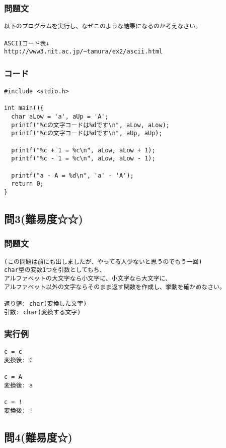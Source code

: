 \subsubsection{問題文}
\begin{verbatim}
以下のプログラムを実行し、なぜこのような結果になるのか考えなさい。

ASCIIコード表↓
http://www3.nit.ac.jp/~tamura/ex2/ascii.html
\end{verbatim}

\subsubsection{コード}
\begin{verbatim}
#include <stdio.h>

int main(){
  char aLow = 'a', aUp = 'A';
  printf("%cの文字コードは%dです\n", aLow, aLow);
  printf("%cの文字コードは%dです\n", aUp, aUp);

  printf("%c + 1 = %c\n", aLow, aLow + 1);
  printf("%c - 1 = %c\n", aLow, aLow - 1);

  printf("a - A = %d\n", 'a' - 'A');
  return 0;
}
\end{verbatim}

\subsection{問3(難易度☆☆)}
\subsubsection{問題文}
\begin{verbatim}
(この問題は前にも出しましたが、やってる人少ないと思うのでもう一回)
char型の変数1つを引数としてもち、
アルファベットの大文字なら小文字に、小文字なら大文字に、
アルファベット以外の文字ならそのまま返す関数を作成し、挙動を確かめなさい。

返り値: char(変換した文字)
引数: char(変換する文字)
\end{verbatim}

\subsubsection{実行例}
\begin{verbatim}
c = c
変換後: C

c = A
変換後: a

c = !
変換後: !
\end{verbatim}

\subsection{問4(難易度☆)}
